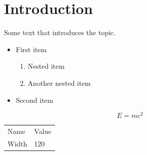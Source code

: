 \documentclass{article}
\begin{document}
\section{Introduction}
Some text that introduces the topic.
\begin{itemize}
\item First item
\begin{enumerate}
\item Nested item
\item Another nested item
\end{enumerate}
\item Second item
\end{itemize}
\begin{equation}
E = mc^2
\end{equation}
\begin{tabular}{ll}
Name & Value \\
Width & 120 \\
\end{tabular}
\end{document}
